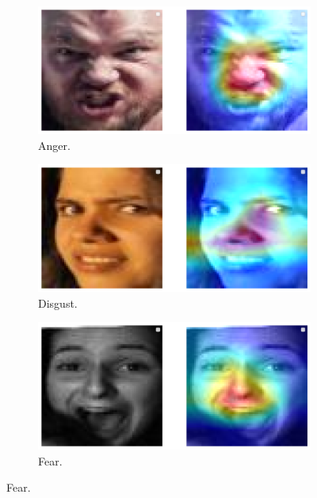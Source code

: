 \begin{figure}[ht]
  \hfill
  \begin{subfigure}{0.3\linewidth}
    \includegraphics[width=\linewidth]{xai_anger.png}
    \caption{Anger.}
    \label{fig:xai4}
  \end{subfigure}
  \hfill
  \begin{subfigure}{0.3\linewidth}
    \includegraphics[width=\linewidth]{xai_disgust.png}
    \caption{Disgust.}
    \label{fig:xai5}
  \end{subfigure}
  \hfill
  \begin{subfigure}{0.3\linewidth}
    \includegraphics[width=\linewidth]{xai_fear.png}
    \caption{Fear.}
    \label{fig:xai6}
  \end{subfigure}

\end{figure}
